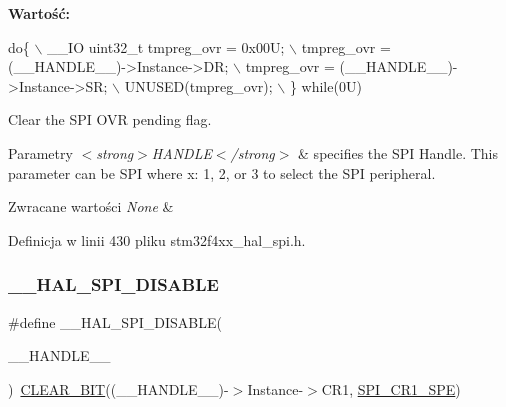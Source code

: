{\bfseries Wartość\+:}
\begin{DoxyCode}
\textcolor{keywordflow}{do}\{                                              \(\backslash\)
    \_\_IO uint32\_t tmpreg\_ovr = 0x00U;              \(\backslash\)
    tmpreg\_ovr = (\_\_HANDLE\_\_)->Instance->DR;       \(\backslash\)
    tmpreg\_ovr = (\_\_HANDLE\_\_)->Instance->SR;       \(\backslash\)
    UNUSED(tmpreg\_ovr);                            \(\backslash\)
  \} \textcolor{keywordflow}{while}(0U)
\end{DoxyCode}


Clear the S\+PI O\+VR pending flag. 


\begin{DoxyParams}{Parametry}
{\em $<$strong$>$\+H\+A\+N\+D\+L\+E$<$/strong$>$} & specifies the S\+PI Handle. This parameter can be S\+PI where x\+: 1, 2, or 3 to select the S\+PI peripheral. \\
\hline
\end{DoxyParams}

\begin{DoxyRetVals}{Zwracane wartości}
{\em None} & \\
\hline
\end{DoxyRetVals}


Definicja w linii 430 pliku stm32f4xx\+\_\+hal\+\_\+spi.\+h.

\mbox{\label{group___s_p_i___exported___macros_gaa10d88f87d16de53bd81dfb33bd56959}} 
\subsubsection{\texorpdfstring{\+\_\+\+\_\+\+H\+A\+L\+\_\+\+S\+P\+I\+\_\+\+D\+I\+S\+A\+B\+LE}{\_\_HAL\_SPI\_DISABLE}}
{\footnotesize\ttfamily \#define \+\_\+\+\_\+\+H\+A\+L\+\_\+\+S\+P\+I\+\_\+\+D\+I\+S\+A\+B\+LE(\begin{DoxyParamCaption}\item[{}]{\+\_\+\+\_\+\+H\+A\+N\+D\+L\+E\+\_\+\+\_\+ }\end{DoxyParamCaption})~\hyperlink{group___exported__macro_ga133aae6fc0d41bffab39ab223a7001de}{C\+L\+E\+A\+R\+\_\+\+B\+IT}((\+\_\+\+\_\+\+H\+A\+N\+D\+L\+E\+\_\+\+\_\+)-\/$>$Instance-\/$>$C\+R1, \hyperlink{group___peripheral___registers___bits___definition_gac5a646d978d3b98eb7c6a5d95d75c3f9}{S\+P\+I\+\_\+\+C\+R1\+\_\+\+S\+PE})}



